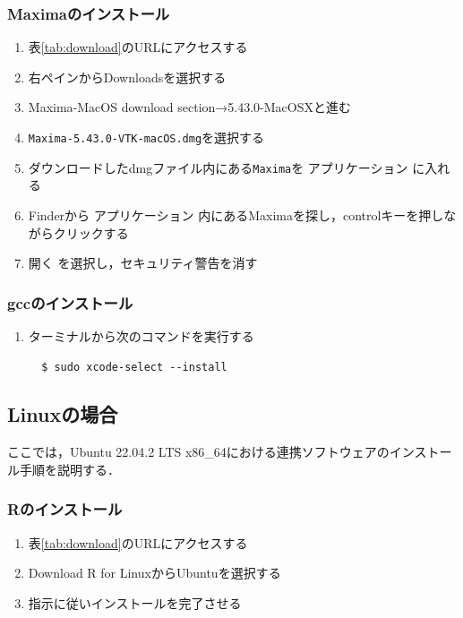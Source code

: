 \subsubsection{Maximaのインストール}
\begin{enumerate}
    \item 表\ref{tab:download}のURLにアクセスする
    \item 右ペインからDownloadsを選択する
    \item Maxima-MacOS download section→5.43.0-MacOSXと進む
    \item \verb|Maxima-5.43.0-VTK-macOS.dmg|を選択する
    \item ダウンロードしたdmgファイル内にある\verb|Maxima|を アプリケーション に入れる
    \item Finderから アプリケーション 内にあるMaximaを探し，controlキーを押しながらクリックする
    \item 開く を選択し，セキュリティ警告を消す
\end{enumerate}

\subsubsection{gccのインストール}
\begin{enumerate}
    \item ターミナルから次のコマンドを実行する
          \begin{lstlisting}
  $ sudo xcode-select --install
          \end{lstlisting}
\end{enumerate}

\subsection{Linuxの場合}

ここでは，Ubuntu 22.04.2 LTS x86\_64における連携ソフトウェアのインストール手順を説明する．

\subsubsection{Rのインストール}
\begin{enumerate}
    \item 表\ref{tab:download}のURLにアクセスする
    \item Download R for LinuxからUbuntuを選択する
    \item 指示に従いインストールを完了させる
\end{enumerate}

